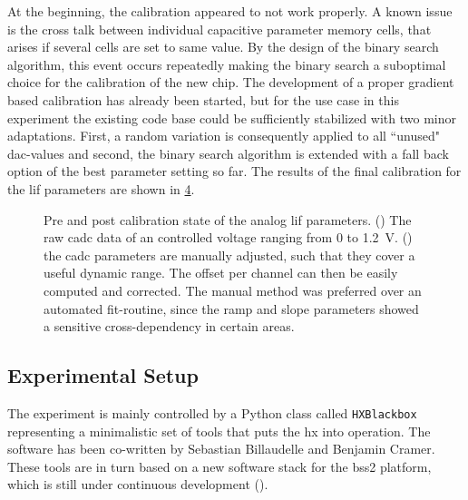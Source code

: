 At the beginning, the calibration appeared to not work properly. A known issue is the cross talk between individual capacitive parameter memory cells, that arises if several cells are set to same value. By the design of the binary search algorithm, this event occurs repeatedly making the binary search a suboptimal choice for the calibration of the new chip. The development of a proper gradient based calibration has already been started, but for the use case in this experiment the existing code base could be sufficiently stabilized with two minor adaptations. First, a random variation is consequently applied to all ``unused" \gls{dac}-values and second, the binary search algorithm is extended with a fall back option of the best parameter setting so far. The results of the final calibration for the \gls{lif} parameters are shown in \cref{hxprepostcalib}.
\begin{figure}
	\begin{subfigure}{0.32\textwidth}
		\caption{}
		\centering
		
		\label{hxprepostvleak}
	\end{subfigure}
	\begin{subfigure}{0.32\textwidth}
		\caption{}
		\centering
		
		\label{hxprepostvreset}
	\end{subfigure}
	\begin{subfigure}{0.32\textwidth}
	\caption{}
	\centering
	
	\label{hxprepostvthreshold}
\end{subfigure}
	\caption[Pre and post calibration state of the analog \gls{lif} parameters.]{Pre and post calibration state of the analog \gls{lif} parameters. () The raw cadc data of an controlled voltage ranging from 0 to \SI{1.2}{\V}. () the cadc parameters are manually adjusted, such that they cover a useful dynamic range. The offset per channel can then be easily computed and corrected. The manual method was preferred over an automated fit-routine, since the ramp and slope parameters showed a sensitive cross-dependency in certain areas.}
	\label{hxprepostcalib}
\end{figure}




\subsection{Experimental Setup}
The experiment is mainly controlled by a Python class called \texttt{HXBlackbox} representing a minimalistic set of tools that puts the \gls{hx} into operation. The software has been co-written by Sebastian Billaudelle and Benjamin Cramer. These tools are in turn based on a new software stack for the \gls{bss2} platform, which is still under continuous development (\citealp{mueller2020bss2ll}).

